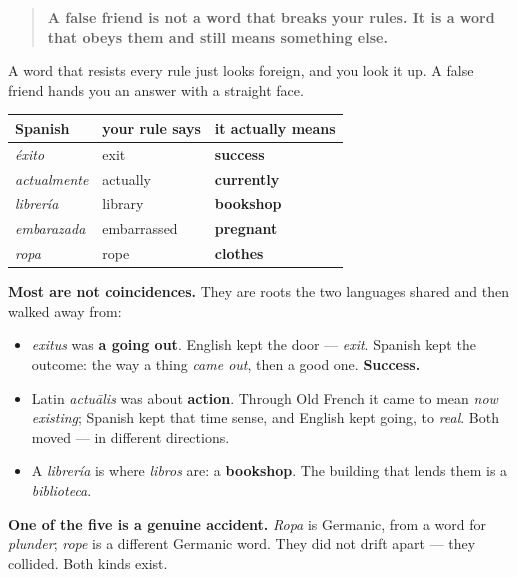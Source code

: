 \begin{grammarlens}[title={Grammar Lens: the words that answer and lie}]
\begin{quote}
\textbf{A false friend is not a word that breaks your rules. It is a word that obeys them and still means something else.}
\end{quote}

A word that resists every rule just looks foreign, and you look it up. A false friend hands you an answer with a straight face.

\noindent
\begin{tabularx}{\linewidth}{@{}>{\raggedright\arraybackslash}X>{\raggedright\arraybackslash}X>{\raggedright\arraybackslash}X@{}}
\toprule
\textbf{Spanish} & \textbf{your rule says} & \textbf{it actually means} \\
\midrule
\emph{éxito} & exit & \textbf{success} \\
\emph{actualmente} & actually & \textbf{currently} \\
\emph{librería} & library & \textbf{bookshop} \\
\emph{embarazada} & embarrassed & \textbf{pregnant} \\
\emph{ropa} & rope & \textbf{clothes} \\
\bottomrule
\end{tabularx}

\textbf{Most are not coincidences.} They are roots the two languages shared and then walked away from:

\begin{itemize}
\raggedright
  \item \emph{exitus} was \textbf{a going out}. English kept the door — \emph{exit}. Spanish kept the outcome: the way a thing \emph{came out}, then a good one. \textbf{Success.}
  \item Latin \emph{actuālis} was about \textbf{action}. Through Old French it came to mean \emph{now existing}; Spanish kept that time sense, and English kept going, to \emph{real}. Both moved — in different directions.
  \item A \emph{librería} is where \emph{libros} are: a \textbf{bookshop}. The building that lends them is a \emph{biblioteca}.
\end{itemize}

\textbf{One of the five is a genuine accident.} \emph{Ropa} is Germanic, from a word for \emph{plunder}; \emph{rope} is a different Germanic word. They did not drift apart — they collided. Both kinds exist.
\end{grammarlens}

